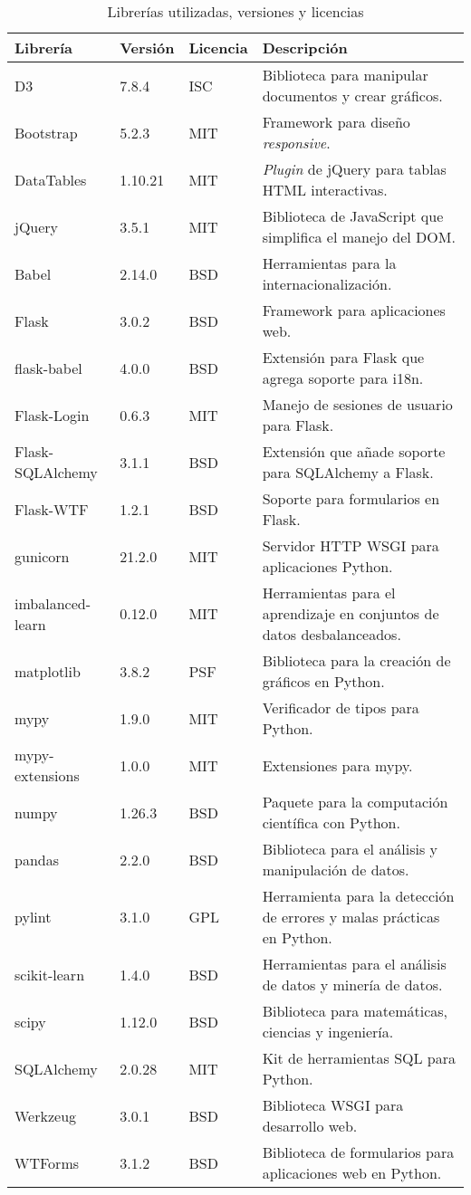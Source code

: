 \begin{table}
	
	\begin{tabular}{lllp{6.5cm}}
		\toprule
    \textbf{Librería} & \textbf{Versión} & \textbf{Licencia} & \textbf{Descripción} \\ 
    \midrule
    D3 & 7.8.4 & ISC & Biblioteca para manipular documentos y crear gráficos.\\
    Bootstrap & 5.2.3 & MIT & Framework para diseño \textit{responsive}.\\
    DataTables & 1.10.21 & MIT & \textit{Plugin} de jQuery para tablas HTML interactivas.\\
    jQuery & 3.5.1 & MIT & Biblioteca de JavaScript que simplifica el manejo del DOM.\\
    Babel & 2.14.0 & BSD & Herramientas para la internacionalización. \\ 
    Flask & 3.0.2 & BSD & Framework para aplicaciones web. \\ 
    flask-babel & 4.0.0 & BSD & Extensión para Flask que agrega soporte para i18n. \\ 
    Flask-Login & 0.6.3 & MIT & Manejo de sesiones de usuario para Flask. \\ 
    Flask-SQLAlchemy & 3.1.1 & BSD & Extensión que añade soporte para SQLAlchemy a Flask. \\ 
    Flask-WTF & 1.2.1 & BSD & Soporte para formularios en Flask. \\ 
    gunicorn & 21.2.0 & MIT & Servidor HTTP WSGI para aplicaciones Python. \\ 
    imbalanced-learn & 0.12.0 & MIT & Herramientas para el aprendizaje en conjuntos de datos desbalanceados. \\ 
    matplotlib & 3.8.2 & PSF & Biblioteca para la creación de gráficos en Python. \\ 
    mypy & 1.9.0 & MIT & Verificador de tipos para Python. \\ 
    mypy-extensions & 1.0.0 & MIT & Extensiones para mypy. \\ 
    numpy & 1.26.3 & BSD & Paquete para la computación científica con Python. \\ 
    pandas & 2.2.0 & BSD & Biblioteca para el análisis y manipulación de datos. \\ 
    pylint & 3.1.0 & GPL & Herramienta para la detección de errores y malas prácticas en Python. \\  
    scikit-learn & 1.4.0 & BSD & Herramientas para el análisis de datos y minería de datos. \\ 
    scipy & 1.12.0 & BSD & Biblioteca para matemáticas, ciencias y ingeniería. \\ 
    SQLAlchemy & 2.0.28 & MIT & Kit de herramientas SQL para Python. \\  
    Werkzeug & 3.0.1 & BSD & Biblioteca WSGI para desarrollo web. \\ 
    WTForms & 3.1.2 & BSD & Biblioteca de formularios para aplicaciones web en Python. \\ 
    \bottomrule
	\end{tabular}
    \caption{Librerías utilizadas, versiones y licencias}
	\label{tabla:librerias}
\end{table}
